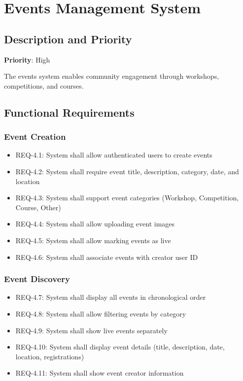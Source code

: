 \documentclass{scrreprt}
\begin{document}
\section{Events Management System}

\subsection{Description and Priority}
\textbf{Priority}: High

The events system enables community engagement through workshops, competitions, and courses.

\subsection{Functional Requirements}

\subsubsection{Event Creation}
\begin{itemize}
\item REQ-4.1: System shall allow authenticated users to create events
\item REQ-4.2: System shall require event title, description, category, date, and location
\item REQ-4.3: System shall support event categories (Workshop, Competition, Course, Other)
\item REQ-4.4: System shall allow uploading event images
\item REQ-4.5: System shall allow marking events as live
\item REQ-4.6: System shall associate events with creator user ID
\end{itemize}

\subsubsection{Event Discovery}
\begin{itemize}
\item REQ-4.7: System shall display all events in chronological order
\item REQ-4.8: System shall allow filtering events by category
\item REQ-4.9: System shall show live events separately
\item REQ-4.10: System shall display event details (title, description, date, location, registrations)
\item REQ-4.11: System shall show event creator information
\end{itemize}
\end{document}
